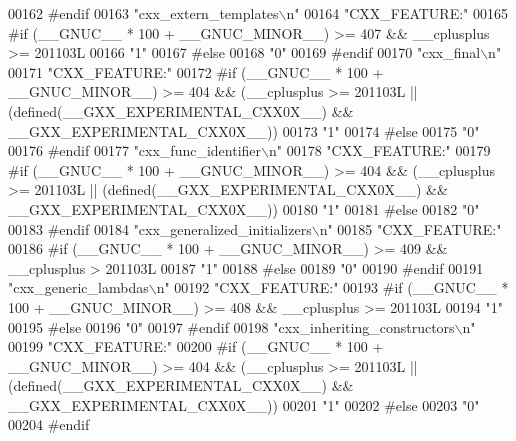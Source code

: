 \begin{DoxyCode}
00162 \textcolor{preprocessor}{#endif}
00163 \textcolor{stringliteral}{"cxx\_extern\_templates\(\backslash\)n"}
00164 \textcolor{stringliteral}{"CXX\_FEATURE:"}
00165 \textcolor{preprocessor}{#if (\_\_GNUC\_\_ * 100 + \_\_GNUC\_MINOR\_\_) >= 407 && \_\_cplusplus >= 201103L}
00166 \textcolor{stringliteral}{"1"}
00167 \textcolor{preprocessor}{#else}
00168 \textcolor{stringliteral}{"0"}
00169 \textcolor{preprocessor}{#endif}
00170 \textcolor{stringliteral}{"cxx\_final\(\backslash\)n"}
00171 \textcolor{stringliteral}{"CXX\_FEATURE:"}
00172 \textcolor{preprocessor}{#if (\_\_GNUC\_\_ * 100 + \_\_GNUC\_MINOR\_\_) >= 404 && (\_\_cplusplus >= 201103L ||
       (defined(\_\_GXX\_EXPERIMENTAL\_CXX0X\_\_) && \_\_GXX\_EXPERIMENTAL\_CXX0X\_\_))}
00173 \textcolor{stringliteral}{"1"}
00174 \textcolor{preprocessor}{#else}
00175 \textcolor{stringliteral}{"0"}
00176 \textcolor{preprocessor}{#endif}
00177 \textcolor{stringliteral}{"cxx\_func\_identifier\(\backslash\)n"}
00178 \textcolor{stringliteral}{"CXX\_FEATURE:"}
00179 \textcolor{preprocessor}{#if (\_\_GNUC\_\_ * 100 + \_\_GNUC\_MINOR\_\_) >= 404 && (\_\_cplusplus >= 201103L ||
       (defined(\_\_GXX\_EXPERIMENTAL\_CXX0X\_\_) && \_\_GXX\_EXPERIMENTAL\_CXX0X\_\_))}
00180 \textcolor{stringliteral}{"1"}
00181 \textcolor{preprocessor}{#else}
00182 \textcolor{stringliteral}{"0"}
00183 \textcolor{preprocessor}{#endif}
00184 \textcolor{stringliteral}{"cxx\_generalized\_initializers\(\backslash\)n"}
00185 \textcolor{stringliteral}{"CXX\_FEATURE:"}
00186 \textcolor{preprocessor}{#if (\_\_GNUC\_\_ * 100 + \_\_GNUC\_MINOR\_\_) >= 409 && \_\_cplusplus > 201103L}
00187 \textcolor{stringliteral}{"1"}
00188 \textcolor{preprocessor}{#else}
00189 \textcolor{stringliteral}{"0"}
00190 \textcolor{preprocessor}{#endif}
00191 \textcolor{stringliteral}{"cxx\_generic\_lambdas\(\backslash\)n"}
00192 \textcolor{stringliteral}{"CXX\_FEATURE:"}
00193 \textcolor{preprocessor}{#if (\_\_GNUC\_\_ * 100 + \_\_GNUC\_MINOR\_\_) >= 408 && \_\_cplusplus >= 201103L}
00194 \textcolor{stringliteral}{"1"}
00195 \textcolor{preprocessor}{#else}
00196 \textcolor{stringliteral}{"0"}
00197 \textcolor{preprocessor}{#endif}
00198 \textcolor{stringliteral}{"cxx\_inheriting\_constructors\(\backslash\)n"}
00199 \textcolor{stringliteral}{"CXX\_FEATURE:"}
00200 \textcolor{preprocessor}{#if (\_\_GNUC\_\_ * 100 + \_\_GNUC\_MINOR\_\_) >= 404 && (\_\_cplusplus >= 201103L ||
       (defined(\_\_GXX\_EXPERIMENTAL\_CXX0X\_\_) && \_\_GXX\_EXPERIMENTAL\_CXX0X\_\_))}
00201 \textcolor{stringliteral}{"1"}
00202 \textcolor{preprocessor}{#else}
00203 \textcolor{stringliteral}{"0"}
00204 \textcolor{preprocessor}{#endif}

\end{DoxyCode}
